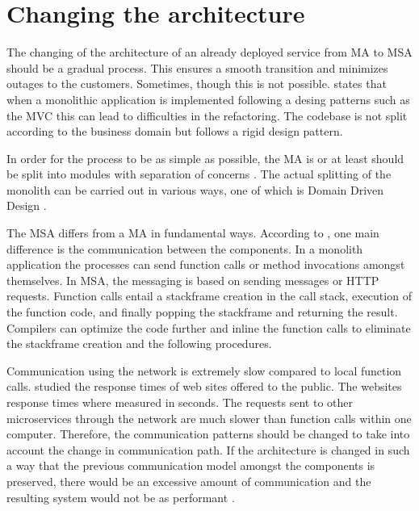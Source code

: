 

\section{Changing the architecture}
\begin{sloppypar}
    The changing of the architecture of an already deployed service from MA to MSA 
    should be a gradual process. This ensures a smooth transition and minimizes 
    outages to the customers. Sometimes, though this is not possible. 
    \citet{newman2019} states that when a monolithic application is 
    implemented following a desing patterns such as the MVC \citep{trygvemvc} 
    this can lead to difficulties in the refactoring. The codebase is not split 
    according to the business domain but follows a rigid design pattern.
\end{sloppypar}
\begin{sloppypar}
    In order for the process to be as simple as possible, the MA is or at least 
    should be split into modules with separation of concerns \citep{secchalmsa}. 
    The actual splitting of the monolith can be carried out in various ways, 
    one of which is Domain Driven Design \citep{newman2019}.
\end{sloppypar}
\begin{sloppypar}
    The MSA differs from a MA in fundamental ways. According to 
    \citet{fowlerlewisms}, one main difference is the communication between 
    the components. In a monolith application the processes can send function 
    calls or method invocations amongst themselves. In MSA, the messaging is 
    based on sending messages or HTTP requests. Function calls entail a 
    stackframe creation in the call stack, execution of the function code, and 
    finally popping the stackframe and returning the result. Compilers can 
    optimize the code further and inline the function calls to eliminate the 
    stackframe creation and the following procedures. 
\end{sloppypar}
\begin{sloppypar}    
    Communication using the network is extremely slow compared to local 
    function calls. \citet{webdelays} studied the response times of web sites 
    offered to the public. The websites response times where measured in 
    seconds. The requests sent to other microservices through the network are 
    much slower than function calls within one computer. Therefore, the 
    communication patterns should be changed to take into account the change in 
    communication path. If the architecture is changed in such a way that the 
    previous communication model amongst the components is preserved, there 
    would be an excessive amount of communication and the resulting system 
    would not be as performant \citep{fowlerlewisms}.
\end{sloppypar}


